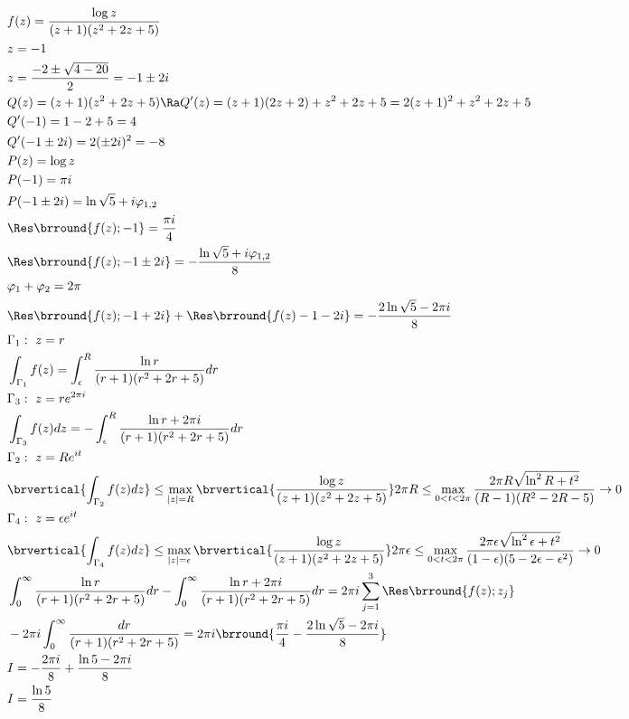 \begin{align*}
    &f(z)=\frac{\log z}{(z+1)(z^2+2z+5)}\\
    &z=-1\\
    &z=\frac{-2\pm\sqrt{4-20}}{2}=-1\pm 2i\\
    &Q(z)=(z+1)(z^2+2z+5)\Ra Q'(z)=(z+1)(2z+2)+z^2+2z+5=2(z+1)^2+z^2+2z+5\\
    &Q'(-1)=1-2+5=4\\
    &Q'(-1\pm 2i)=2(\pm 2i)^2=-8\\
    &P(z)=\log z\\
    &P(-1)=\pi i\\
    &P(-1\pm 2i)=\ln\sqrt{5}+i\varphi_{1,2}\\
    &\Res\brround{f(z);-1}=\frac{\pi i}{4}\\
    &\Res\brround{f(z);-1\pm 2i}=-\frac{\ln\sqrt{5}+i\varphi_{1,2}}{8}\\
    &\varphi_1+\varphi_2=2\pi\\
    &\Res\brround{f(z);-1+2i}+\Res\brround{f(z)-1-2i}=-\frac{2\ln\sqrt{5}-2\pi i}{8}\\
    &\Gamma_1:\ z=r\\
    &\int_{\Gamma_1}f(z)=\int_\epsilon^R\frac{\ln r}{(r+1)(r^2+2r+5)}dr\\
    &\Gamma_3:\ z=re^{2\pi i}\\
    &\int_{\Gamma_3}f(z)dz=-\int_\epsilon^R\frac{\ln r+2\pi i}{(r+1)(r^2+2r+5)}dr\\
    &\Gamma_2:\ z=Re^{it}\\
    &\brvertical{\int_{\Gamma_2}f(z)dz}\leq\max_{|z|=R}\brvertical{\frac{\log z}{(z+1)(z^2+2z+5)}}2\pi R\leq\max_{0<t<2\pi}\frac{2\pi R\sqrt{\ln^2R+t^2}}{(R-1)(R^2-2R-5)}\to 0\\
    &\Gamma_4:\ z=\epsilon e^{it}\\
    &\brvertical{\int_{\Gamma_4}f(z)dz}\leq\max_{|z|=\epsilon}\brvertical{\frac{\log z}{(z+1)(z^2+2z+5)}}2\pi \epsilon\leq\max_{0<t<2\pi}\frac{2\pi \epsilon\sqrt{\ln^2\epsilon+t^2}}{(1-\epsilon)(5-2\epsilon-\epsilon^2)}\to 0\\
    &\int_0^\infty\frac{\ln r}{(r+1)(r^2+2r+5)}dr-\int_0^\infty\frac{\ln r+2\pi i}{(r+1)(r^2+2r+5)}dr=2\pi i\sum_{j=1}^3\Res\brround{f(z);z_j}\\
    &-2\pi i\int_0^\infty\frac{dr}{(r+1)(r^2+2r+5)}=2\pi i\brround{\frac{\pi i}{4}-\frac{2\ln\sqrt{5}-2\pi i}{8}}\\
    &I=-\frac{2\pi i}{8}+\frac{\ln 5-2\pi i}{8}\\
    &I=\frac{\ln 5}{8}
\end{align*}

